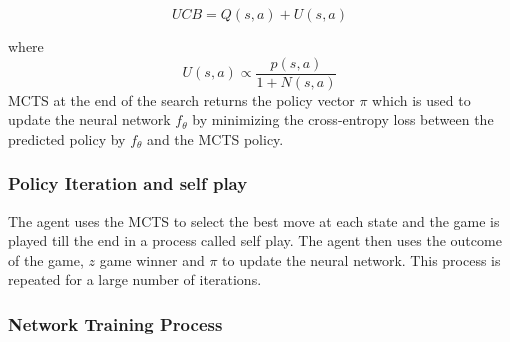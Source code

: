 \begin{equation}
    UCB = Q(s, a) + U(s, a)
\end{equation}

where \[U(s, a) \propto \frac{p(s, a)}{1 + N(s, a)}\] MCTS at the end of the search returns the policy vector \( \pi \) which is used
to update the neural network \( f_\theta \) by minimizing the cross-entropy
loss between the predicted policy by $f_\theta$ and the MCTS policy.

\subsubsection{Policy Iteration and self play}
The agent uses the MCTS to select the best move at each state and the game is
played till the end in a process called self play. The agent then uses the
outcome of the game, $z$ game winner and $\pi$ to update the neural network.
This process is repeated for a large number of iterations.

\subsubsection{Network Training Process}

